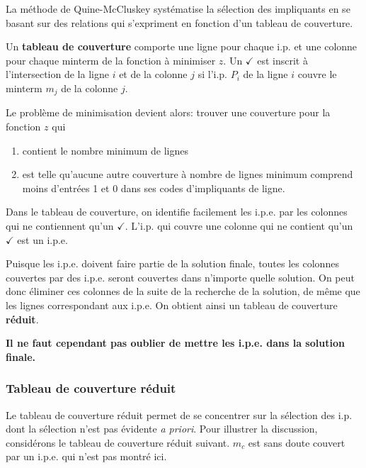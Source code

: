 \documentclass[11pt]{article}
\begin{document}
La méthode de Quine-McCluskey systématise la sélection des impliquants
en se basant sur des relations qui s'expriment en fonction d'un
tableau de couverture.

Un \textbf{tableau de couverture} comporte une ligne pour chaque i.p. et une
colonne pour chaque minterm de la fonction à minimiser \(z\). Un \(\checkmark\) est
inscrit à l'intersection de la ligne \(i\) et de la colonne  \(j\) si
l'i.p.  \(P_i\) de la ligne  \(i\) couvre le minterm  \(m_j\) de la colonne
 \(j\).

Le problème de minimisation devient alors: trouver une couverture pour
la fonction \(z\) qui

\begin{enumerate}
\item contient le nombre minimum de lignes

\item est telle qu'aucune autre couverture à nombre de lignes minimum
comprend moins d'entrées 1 et 0 dans ses codes d'impliquants de
ligne.
\end{enumerate}

Dans le tableau de couverture, on identifie facilement les i.p.e. par
les colonnes qui ne contiennent qu'un \(\checkmark\). L'i.p. qui couvre une colonne
qui ne contient qu'un \(\checkmark\) est un i.p.e.

Puisque les i.p.e. doivent faire partie de la solution finale, toutes
les colonnes couvertes par des i.p.e. seront couvertes dans n'importe
quelle solution. On peut donc éliminer ces colonnes de la suite de la
recherche de la solution, de même que les lignes correspondant aux
i.p.e. On obtient ainsi un tableau de couverture \textbf{réduit}.

\textbf{Il ne faut cependant pas oublier de mettre les i.p.e. dans la solution
finale.}

\subsubsection{Tableau de couverture réduit}
\label{sec:org918b2ab}

Le tableau de couverture réduit permet de se concentrer sur la
sélection des i.p. dont la sélection n'est pas évidente \emph{a
priori}. Pour illustrer la discussion, considérons le tableau de
couverture réduit suivant. \(m_c\) est sans doute couvert par un
i.p.e. qui n'est pas montré ici.
\end{document}
